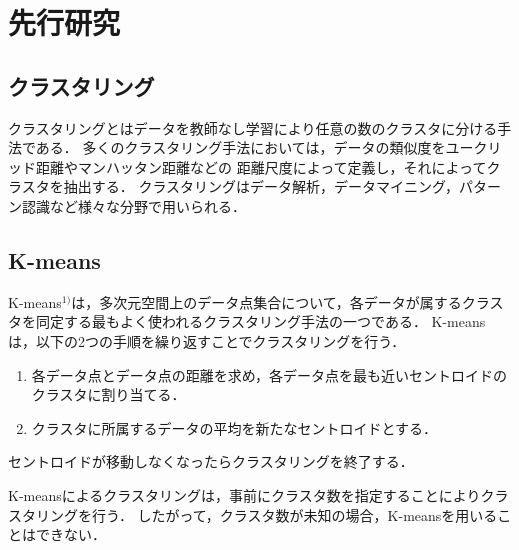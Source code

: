 \section{先行研究}

\subsection{クラスタリング}
クラスタリングとはデータを教師なし学習により任意の数のクラスタに分ける手法である．
多くのクラスタリング手法においては，データの類似度をユークリッド距離やマンハッタン距離などの
距離尺度によって定義し，それによってクラスタを抽出する．
クラスタリングはデータ解析，データマイニング，パターン認識など様々な分野で用いられる．

\subsection{K-means}
K-means$^{1)}$は，多次元空間上のデータ点集合について，各データが属するクラスタを同定する最もよく使われるクラスタリング手法の一つである．
K-meansは，以下の2つの手順を繰り返すことでクラスタリングを行う．
\begin{enumerate}
  \item 各データ点とデータ点の距離を求め，各データ点を最も近いセントロイドのクラスタに割り当てる．
  \item クラスタに所属するデータの平均を新たなセントロイドとする．
\end{enumerate}
セントロイドが移動しなくなったらクラスタリングを終了する．

% 
% 

K-meansによるクラスタリングは，事前にクラスタ数を指定することによりクラスタリングを行う．
したがって，クラスタ数が未知の場合，K-meansを用いることはできない．

